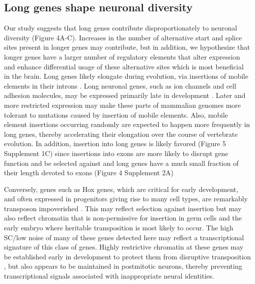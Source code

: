 \subsection{Long genes shape neuronal diversity}
Our study suggests that long genes contribute disproportionately to neuronal diversity (Figure 4A-C). Increases in the number of alternative start and splice sites present in longer genes may contribute, but in addition, we hypothesize that longer genes have a larger number of regulatory elements that alter expression and enhance differential usage of these alternative sites which is most beneficial in the brain. Long genes likely elongate during evolution, via insertions of mobile elements in their introns \citep{Sela_2007,Grishkevich_2014}. Long neuronal genes, such as ion channels and cell adhesion molecules, may be expressed primarily late in development \citep{Okaty_2009}. Later and more restricted expression may make these parts of mammalian genomes more tolerant to mutations caused by insertion of mobile elements. Also, mobile element insertions occurring randomly are expected to happen more frequently in long genes, thereby accelerating their elongation over the course of vertebrate evolution. In addition, insertion into long genes is likely favored (Figure 5 Supplement 1C) since insertions into exons are more likely to disrupt gene function and be selected against and long genes have a much small fraction of their length devoted to exons (Figure 4 Supplement 2A) %

Conversely, genes such as Hox genes, which are critical for early development, and often expressed in progenitors giving rise to many cell types, are remarkably transposon impoverished \citep{Chinwalla_2002,Simons_2005}. This may reflect selection against insertion but may also reflect chromatin that is non-permissive for insertion in germ cells and the early embryo where heritable transposition is most likely to occur. The high SC/low noise of many of these genes detected here may reflect a transcriptional signature of this class of genes. Highly restrictive chromatin at these genes may be established early in development to protect them from disruptive transposition \citep{Montavon_2014}, but also appears to be maintained in postmitotic neurons, thereby preventing transcriptional signals associated with inappropriate neural identities. 

